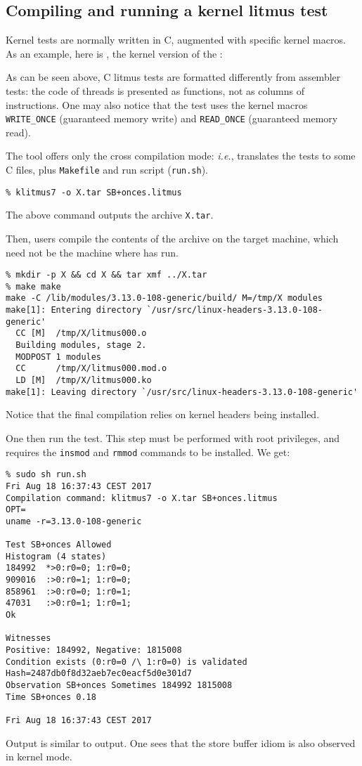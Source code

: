 \subsection{Compiling and running a kernel litmus test}
Kernel tests are normally written in C, augmented with specific kernel macros.
As an example, here is ,
the kernel version of the :


As can be seen above, C litmus tests are formatted differently from assembler
tests: the code of threads is presented as functions, not as columns of
instructions. One may also notice that the test uses the kernel macros
\verb+WRITE_ONCE+ (guaranteed memory write) and \verb+READ_ONCE+
(guaranteed memory read).

The tool \klitmus{} offers only the cross compilation mode:
\emph{i.e.}, \klitmus{} translates the tests to some C files, plus
\texttt{Makefile} and run script (\texttt{run.sh}).
\begin{verbatim}
% klitmus7 -o X.tar SB+onces.litmus
\end{verbatim}
The above command outputs the archive \verb+X.tar+.

Then, users compile the contents of the archive on the target machine, which
need not be the machine where \klitmus{} has run.
\begin{verbatim}
% mkdir -p X && cd X && tar xmf ../X.tar
% make make
make -C /lib/modules/3.13.0-108-generic/build/ M=/tmp/X modules
make[1]: Entering directory `/usr/src/linux-headers-3.13.0-108-generic'
  CC [M]  /tmp/X/litmus000.o
  Building modules, stage 2.
  MODPOST 1 modules
  CC      /tmp/X/litmus000.mod.o
  LD [M]  /tmp/X/litmus000.ko
make[1]: Leaving directory `/usr/src/linux-headers-3.13.0-108-generic'
\end{verbatim}
Notice that the final compilation relies on kernel headers being installed.

One then run the test. This step must be performed with root
privileges, and requires the \texttt{insmod} and \texttt{rmmod}
commands to be installed. We get:
\begin{verbatim}
% sudo sh run.sh
Fri Aug 18 16:37:43 CEST 2017
Compilation command: klitmus7 -o X.tar SB+onces.litmus
OPT=
uname -r=3.13.0-108-generic

Test SB+onces Allowed
Histogram (4 states)
184992  *>0:r0=0; 1:r0=0;
909016  :>0:r0=1; 1:r0=0;
858961  :>0:r0=0; 1:r0=1;
47031   :>0:r0=1; 1:r0=1;
Ok

Witnesses
Positive: 184992, Negative: 1815008
Condition exists (0:r0=0 /\ 1:r0=0) is validated
Hash=2487db0f8d32aeb7ec0eacf5d0e301d7
Observation SB+onces Sometimes 184992 1815008
Time SB+onces 0.18

Fri Aug 18 16:37:43 CEST 2017
\end{verbatim}
Output is similar to \litmus{} output. One sees that the store buffer idiom
is also observed in kernel mode.

